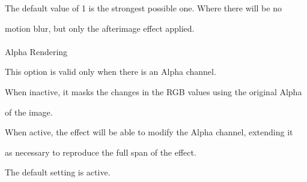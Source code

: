 \documentclass[a4paper,12pt]{article}
\begin{document}
The default value of 1 is the strongest possible one. Where there will be no\par 
motion blur, but only the afterimage effect applied.\\
\\
Alpha Rendering\par
This option is valid only when there is an Alpha channel.\par
When inactive, it masks the changes in the RGB values using the original Alpha\par 
of the image.\par
When active, the effect will be able to modify the Alpha channel, extending it\par 
as necessary to reproduce the full span of the effect.\par
The default setting is active.
\end{document}
